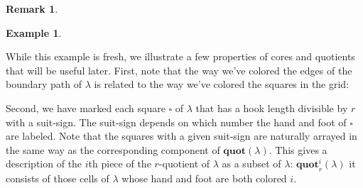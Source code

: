 \documentclass{amsart}[12pt]
\theoremstyle{definition}
\newtheorem{example}[dummy]{Example}
\newtheorem{remark}[dummy]{Remark}
\newcommand{\quot}{\mathbf{quot}}
\begin{document}
\begin{remark}
\begin{example}
\begin{center}
\end{center}
\end{example}

While this example is fresh, we illustrate a few properties of cores and quotients that will be useful later.  First, note that the way we've colored the edges of the boundary path of $\lambda$ is related to the way we've colored the squares in the grid:

Second, we have marked each square $\square$ of $\lambda$ that has a hook length divisible by $r$ with a suit-sign.  The suit-sign depends on which number the hand and foot of $\square$ are labeled.  Note that the squares with a given suit-sign are naturally arrayed in the same way as the corresponding component of $\quot(\lambda)$.  This gives a description of the $i$th piece of the $r$-quotient of $\lambda$ as a subset of $\lambda$: $\quot_r^i(\lambda)$ it consists of those cells of $\lambda$ whose hand and foot are both colored $i$.  


\end{remark}
\end{document}
